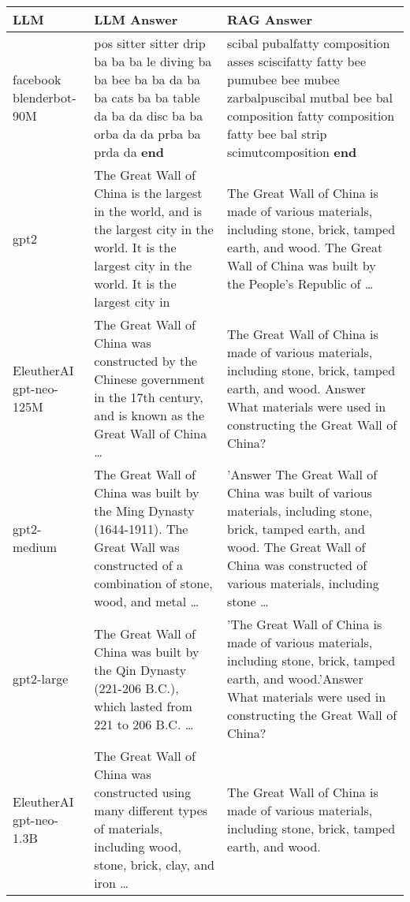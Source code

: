 \documentclass[11pt]{wseas}
\begin{document}
\begin{longtable}[]{@{}
  >{\raggedright\arraybackslash}p{}
  >{\raggedright\arraybackslash}p{}
  >{\raggedright\arraybackslash}p{}@{}}
\toprule\noalign{}
\begin{minipage}[b]{\linewidth}\raggedright
LLM
\end{minipage} & \begin{minipage}[b]{\linewidth}\raggedright
LLM Answer
\end{minipage} & \begin{minipage}[b]{\linewidth}\raggedright
RAG Answer
\end{minipage} \\
\midrule\noalign{}
\endhead
\bottomrule\noalign{}
\endlastfoot
facebook blenderbot-90M & pos sitter sitter drip ba ba ba le diving ba
ba bee ba ba da ba ba cats ba ba table da ba da disc ba ba orba da da
prba ba prda da \textbf{end} & scibal pubalfatty composition asses
sciscifatty fatty bee pumubee bee mubee zarbalpuscibal mutbal bee bal
composition fatty composition fatty bee bal strip scimutcomposition
\textbf{end} \\
gpt2 & The Great Wall of China is the largest in the world, and is the
largest city in the world. It is the largest city in the world. It is
the largest city in & The Great Wall of China is made of various
materials, including stone, brick, tamped earth, and wood. The Great
Wall of China was built by the People's Republic of \ldots{} \\
EleutherAI gpt-neo-125M & The Great Wall of China was constructed by the
Chinese government in the 17th century, and is known as the Great Wall
of China \ldots{} & The Great Wall of China is made of various
materials, including stone, brick, tamped earth, and wood. Answer What
materials were used in constructing the Great Wall of China? \\
gpt2-medium & The Great Wall of China was built by the Ming Dynasty
(1644-1911). The Great Wall was constructed of a combination of stone,
wood, and metal \ldots{} & 'Answer The Great Wall of China was built of
various materials, including stone, brick, tamped earth, and wood. The
Great Wall of China was constructed of various materials, including
stone \ldots{} \\
gpt2-large & The Great Wall of China was built by the Qin Dynasty
(221-206 B.C.), which lasted from 221 to 206 B.C. \ldots{} & 'The Great
Wall of China is made of various materials, including stone, brick,
tamped earth, and wood.'Answer What materials were used in constructing
the Great Wall of China? \\
EleutherAI gpt-neo-1.3B & The Great Wall of China was constructed using
many different types of materials, including wood, stone, brick, clay,
and iron \ldots{} & The Great Wall of China is made of various
materials, including stone, brick, tamped earth, and wood. \\
\end{longtable}
\end{document}

